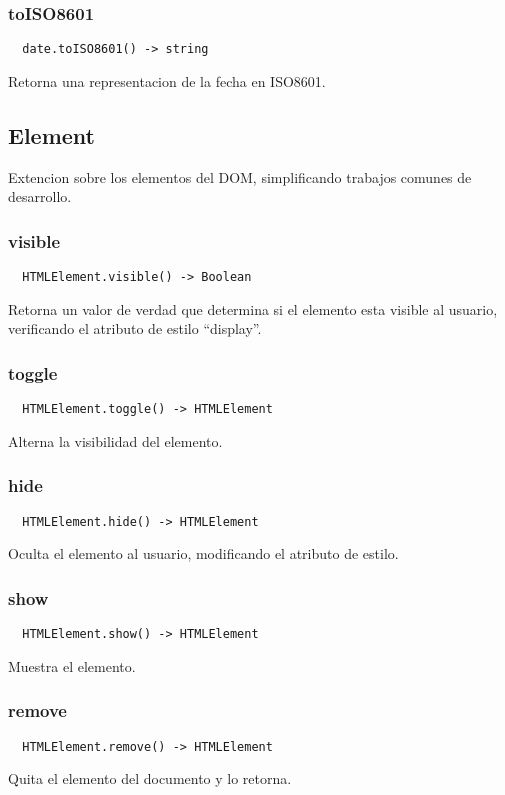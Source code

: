 \subsubsection*{toISO8601}
\begin{verbatim}
  date.toISO8601() -> string
\end{verbatim}
Retorna una representacion de la fecha en ISO8601.

\subsection{Element}
Extencion sobre los elementos del DOM, simplificando trabajos comunes de
desarrollo.
\subsubsection*{visible}
\begin{verbatim}
  HTMLElement.visible() -> Boolean
\end{verbatim}
Retorna un valor de verdad que determina si el elemento esta visible al
usuario, verificando el atributo de estilo ``display''.

\subsubsection*{toggle}
\begin{verbatim}
  HTMLElement.toggle() -> HTMLElement
\end{verbatim}
Alterna la visibilidad del elemento.

\subsubsection*{hide}
\begin{verbatim}
  HTMLElement.hide() -> HTMLElement
\end{verbatim}
Oculta el elemento al usuario, modificando el atributo de estilo.

\subsubsection*{show}
\begin{verbatim}
  HTMLElement.show() -> HTMLElement
\end{verbatim}
Muestra el elemento.

\subsubsection*{remove}
\begin{verbatim}
  HTMLElement.remove() -> HTMLElement
\end{verbatim}
Quita el elemento del documento y lo retorna.

